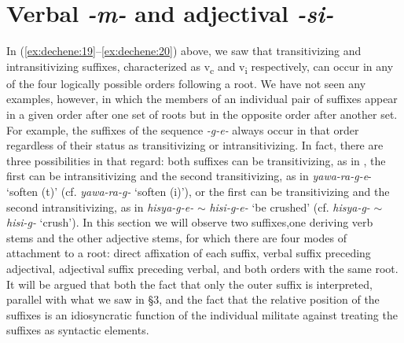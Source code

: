\documentclass[output=paper,
modfonts
]{LSP/langsci}
\begin{document}
\section{Verbal \textit{-m-} and adjectival \textit{-si-}}\label{verbal}\label{sec:dechene:4}

In (\ref{ex:dechene:19}--\ref{ex:dechene:20}) above, we saw that transitivizing and intransitivizing
suffixes, characterized as v\textsubscript{c} and v\textsubscript{i}
respectively, can occur in any of the four logically possible orders
following a root. We have not seen any examples, however, in which the
members of an individual pair of suffixes appear in a given order after
one set of roots but in the opposite order after another set. For
example, the suffixes of the sequence \textit{-g-e-} always occur in that
order regardless of their status as transitivizing or intransitivizing.
In fact, there are three possibilities in that regard: both suffixes can
be transitivizing, as in , the first can be intransitivizing and
the second transitivizing, as in \textit{yawa-ra-g-e}- `soften (t)' (cf.
\textit{yawa-ra-g-} `soften (i)'), or the first can be transitivizing and
the second intransitivizing, as in \textit{hisya-g-e-} $\sim$ \textit{hisi-g-e-}
`be crushed' (cf. \textit{hisya-g-} $\sim$ \textit{hisi-g-} `crush'). In this
section we will observe two suffixes,one deriving verb stems and the
other adjective stems, for which there are four modes of attachment to a
root: direct affixation of each suffix, verbal suffix preceding
adjectival, adjectival suffix preceding verbal, and both orders with the
same root. It will be argued that both the fact that only the outer
suffix is interpreted, parallel with what we saw in \S3, and the
fact that the relative position of the suffixes is an idiosyncratic
function of the individual  militate against treating the suffixes
as syntactic elements.
\end{document}
